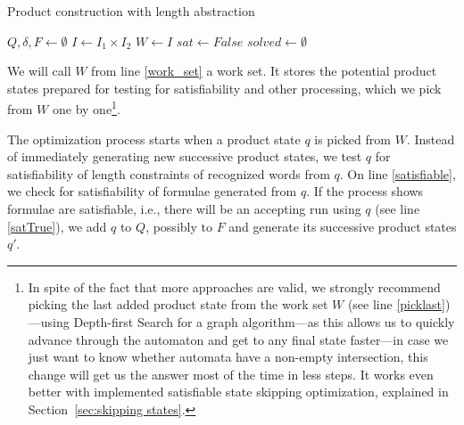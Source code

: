 \begin{algorithm}
\caption{Product construction with length abstraction}\label{productConstructionLengthAbstrAlg}
\DontPrintSemicolon
{}
\BlankLine
$Q, \delta, F \gets \emptyset$ \;
$I \gets I_1 \times I_2$ \;
$W \gets I$ \;\label{work_set}
$sat \gets False$ \;\label{sat}
$solved \gets \emptyset$ \;\label{solved}
\end{algorithm}\DecMargin{1em}

We will call $W$ from line \ref{work_set} a work set. It stores the potential product states prepared for testing for satisfiability and other processing, which we pick from $W$ one by one\footnote{In spite of the fact that more approaches are valid, we strongly recommend picking the last added product state from the work set $W$ (see line \ref{picklast})---using Depth-first Search for a graph algorithm---as this allows us to quickly advance through the automaton and get to any final state faster---in case we just want to know whether automata have a non-empty intersection, this change will get us the answer most of the time in less steps. It works even better with implemented satisfiable state skipping optimization, explained in Section~\ref{sec:skipping states}.}.

The optimization process starts when a product state $q$ is picked from $W$. Instead of immediately generating new successive product states, we test $q$ for satisfiability of length constraints of recognized words from $q$. On line \ref{satisfiable}, we check for satisfiability of formulae generated from $q$. If the process shows formulae are satisfiable, i.e., there will be an accepting run using $q$ (see line \ref{satTrue}), we add $q$ to $Q$, possibly to $F$ and generate its successive product states $q'$.


